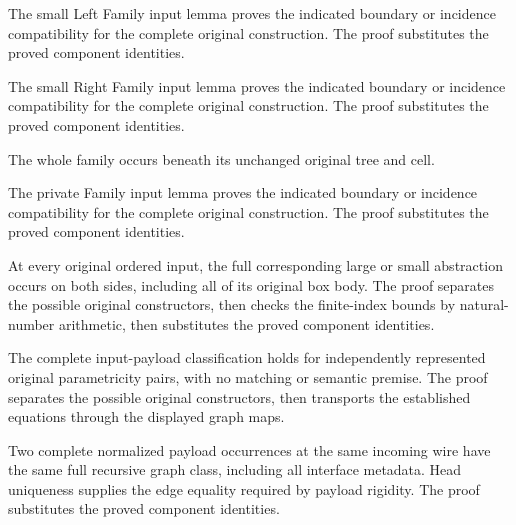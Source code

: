 The small Left Family input lemma proves the indicated boundary or incidence compatibility for the complete original construction.
The proof substitutes the proved component identities.
\par{}

The small Right Family input lemma proves the indicated boundary or incidence compatibility for the complete original construction.
The proof substitutes the proved component identities.
\par{}

The whole family occurs beneath its unchanged original tree and cell.
\par{}

The private Family input lemma proves the indicated boundary or incidence compatibility for the complete original construction.
The proof substitutes the proved component identities.
\par{}

At every original ordered input, the full corresponding large or small
abstraction occurs on both sides, including all of its original box body.
The proof separates the possible original constructors, then checks the finite-index bounds by natural-number arithmetic, then substitutes the proved component identities.
\par{}

The complete input-payload classification holds for independently
represented original parametricity pairs, with no matching or semantic premise.
The proof separates the possible original constructors, then transports the established equations through the displayed graph maps.
\par{}

Two complete normalized payload occurrences at the same incoming wire
have the same full recursive graph class, including all interface metadata.
Head uniqueness supplies the edge equality required by payload rigidity.
The proof substitutes the proved component identities.
\par{}

